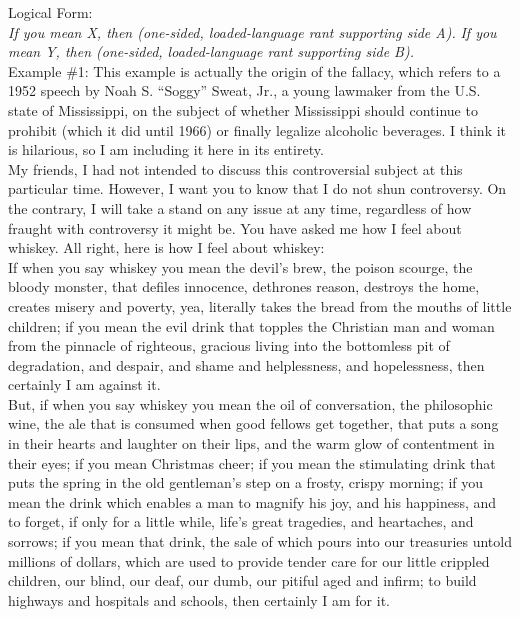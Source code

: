 \documentclass[a4paper,12pt,single,pdftex]{scrbook}
\begin{document}
    
      Logical Form:
    \\

    
      {\em If you mean X, then (one-sided, loaded-language rant supporting side A).} \newline
{\em If you mean Y, then (one-sided, loaded-language rant supporting side B).}
    \\

    
      Example \#1: This example is actually the origin of the fallacy, which refers to a 1952 speech by Noah S. “Soggy” Sweat, Jr., a young lawmaker from the U.S. state of Mississippi, on the subject of whether Mississippi should continue to prohibit (which it did until 1966) or finally legalize alcoholic beverages.  I think it is hilarious, so I am including it here in its entirety.
    \\

    
      My friends, I had not intended to discuss this controversial subject at this particular time. However, I want you to know that I do not shun controversy. On the contrary, I will take a stand on any issue at any time, regardless of how fraught with controversy it might be. You have asked me how I feel about whiskey. All right, here is how I feel about whiskey:
    \\

    
      If when you say whiskey you mean the devil’s brew, the poison scourge, the bloody monster, that defiles innocence, dethrones reason, destroys the home, creates misery and poverty, yea, literally takes the bread from the mouths of little children; if you mean the evil drink that topples the Christian man and woman from the pinnacle of righteous, gracious living into the bottomless pit of degradation, and despair, and shame and helplessness, and hopelessness, then certainly I am against it.
    \\

    
      But, if when you say whiskey you mean the oil of conversation, the philosophic wine, the ale that is consumed when good fellows get together, that puts a song in their hearts and laughter on their lips, and the warm glow of contentment in their eyes; if you mean Christmas cheer; if you mean the stimulating drink that puts the spring in the old gentleman’s step on a frosty, crispy morning; if you mean the drink which enables a man to magnify his joy, and his happiness, and to forget, if only for a little while, life’s great tragedies, and heartaches, and sorrows; if you mean that drink, the sale of which pours into our treasuries untold millions of dollars, which are used to provide tender care for our little crippled children, our blind, our deaf, our dumb, our pitiful aged and infirm; to build highways and hospitals and schools, then certainly I am for it.
    \\
\end{document}

